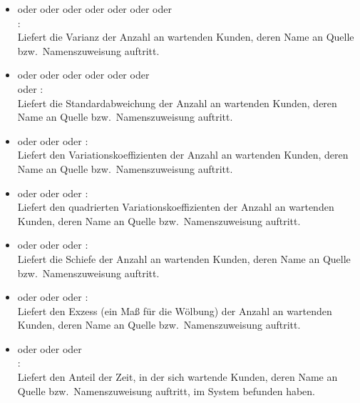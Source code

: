 \begin{itemize}
\item
{} oder  oder  oder  oder  oder  oder  oder\\
:\\
Liefert die Varianz der Anzahl an wartenden Kunden, deren Name an Quelle bzw.\ Namenszuweisung  auftritt.

\item
{} oder  oder  oder  oder  oder  oder\\  oder :\\
Liefert die Standardabweichung der Anzahl an wartenden Kunden, deren Name an Quelle bzw.\ Namenszuweisung  auftritt.

\item
{} oder  oder  oder :\\
Liefert den Variationskoeffizienten der Anzahl an wartenden Kunden, deren Name an Quelle bzw.\ Namenszuweisung  auftritt.

\item
{} oder  oder  oder :\\
Liefert den quadrierten Variationskoeffizienten der Anzahl an wartenden Kunden, deren Name an Quelle bzw.\ Namenszuweisung  auftritt.

\item
{} oder  oder  oder :\\
Liefert die Schiefe der Anzahl an wartenden Kunden, deren Name an Quelle bzw.\ Namenszuweisung  auftritt.

\item
{} oder  oder  oder :\\
Liefert den Exzess (ein Maß für die Wölbung) der Anzahl an wartenden Kunden, deren Name an Quelle bzw.\ Namenszuweisung  auftritt.

\item
{} oder  oder  oder\\ :\\
Liefert den Anteil der Zeit, in der sich  wartende Kunden, deren Name an Quelle bzw.\ Namenszuweisung  auftritt, im System befunden haben.


\end{itemize}
